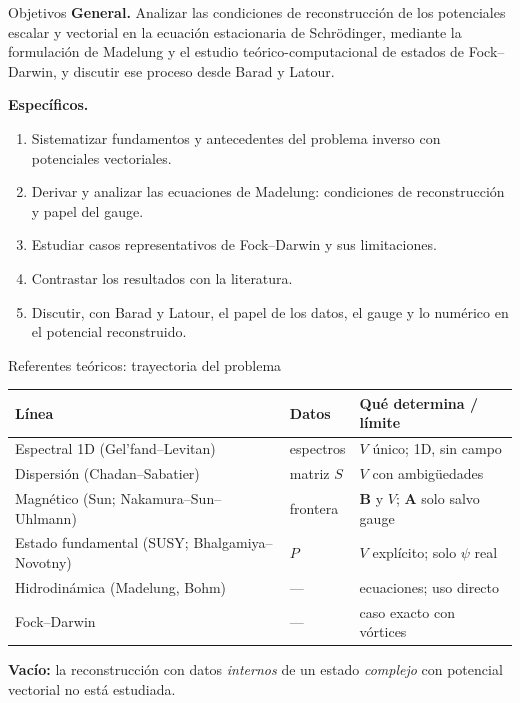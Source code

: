 \documentclass[aspectratio=169,10pt]{beamer}
\newcommand{\Av}{\mathbf{A}}
\begin{document}
\begin{frame}{Objetivos}
  \textbf{General.} Analizar las condiciones de reconstrucción de los potenciales escalar y vectorial en la ecuación
  estacionaria de Schrödinger, mediante la formulación de Madelung y el estudio teórico-computacional de estados de
  Fock--Darwin, y discutir ese proceso desde Barad y Latour.
  \vspace{0.4em}

  \textbf{Específicos.}
  \begin{enumerate}
    \item[OE1] Sistematizar fundamentos y antecedentes del problema inverso con potenciales vectoriales.
    \item[OE2] Derivar y analizar las ecuaciones de Madelung: condiciones de reconstrucción y papel del gauge.
    \item[OE3] Estudiar casos representativos de Fock--Darwin y sus limitaciones.
    \item[OE4] Contrastar los resultados con la literatura.
    \item[OE5] Discutir, con Barad y Latour, el papel de los datos, el gauge y lo numérico en el potencial reconstruido.
  \end{enumerate}
\end{frame}

\begin{frame}{Referentes teóricos: trayectoria del problema}
  \small
  \begin{tabular}{@{}p{3.4cm} p{3.6cm} p{5.6cm}@{}}
    \toprule
    \textbf{Línea} & \textbf{Datos} & \textbf{Qué determina / límite} \\
    \midrule
    Espectral 1D (Gel'fand--Levitan) & espectros & $V$ único; 1D, sin campo \\
    Dispersión (Chadan--Sabatier) & matriz $S$ & $V$ con ambigüedades \\
    Magnético (Sun; Nakamura--Sun--Uhlmann) & frontera & $\mathbf B$ y $V$; $\Av$ solo salvo gauge \\
    Estado fundamental (SUSY; Bhalgamiya--Novotny) & $P$ & $V$ explícito; solo $\psi$ real \\
    Hidrodinámica (Madelung, Bohm) & --- & ecuaciones; uso directo \\
    Fock--Darwin & --- & caso exacto con vórtices \\
    \bottomrule
  \end{tabular}

  \vspace{0.6em}
  \normalsize
  \textbf{Vacío:} la reconstrucción con datos \emph{internos} de un estado \emph{complejo} con potencial vectorial no está
  estudiada.
\end{frame}
\end{document}
